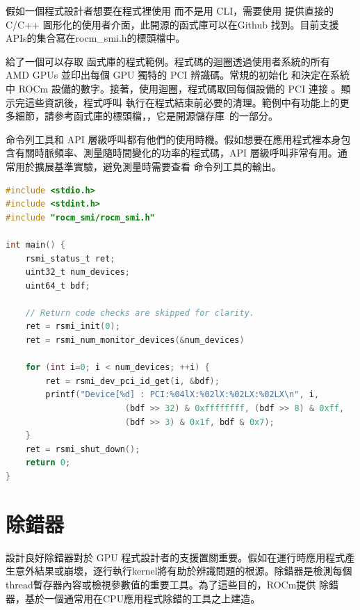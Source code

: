 假如一個程式設計者想要在程式裡使用  而不是用 CLI，需要使用  提供直接的 C/C++ 圖形化的使用者介面，此開源的函式庫可以在Github \cite{ROCm-SMI-Lib} 找到。目前支援APIs的集合寫在rocm\_smi.h的標頭檔中。

 給了一個可以存取  函式庫的程式範例。程式碼的迴圈透過使用者系統的所有 AMD GPUs 並印出每個 GPU 獨特的 PCI  辨識碼。常規的初始化  和決定在系統中 ROCm 設備的數字。接著，使用迴圈，程式碼取回每個設備的 PCI 連接 。顯示完這些資訊後，程式呼叫  執行在程式結束前必要的清理。範例中有功能上的更多細節，請參考函式庫的標頭檔，，它是開源儲存庫~\cite{ROCm-SMI-Lib}的一部分。

命令列工具和 API 層級呼叫都有他們的使用時機。假如想要在應用程式裡本身包含有關時脈頻率、測量隨時間變化的功率的程式碼，API 層級呼叫非常有用。通常用於擴展基準實驗，避免測量時需要查看  命令列工具的輸出。

\begin{lstlisting}[language=C, caption={\term{ROCm-SMI-Lib}範例}, label={lst:ROCm-SMI-Lib}]
#include <stdio.h>
#include <stdint.h>
#include "rocm_smi/rocm_smi.h"

int main() {
    rsmi_status_t ret;
    uint32_t num_devices;
    uint64_t bdf;

    // Return code checks are skipped for clarity.
    ret = rsmi_init(0);
    ret = rsmi_num_monitor_devices(&num_devices)

    for (int i=0; i < num_devices; ++i) {
        ret = rsmi_dev_pci_id_get(i, &bdf);
        printf("Device[%d] : PCI:%04lX:%02lX:%02LX:%02LX\n", i,
                        (bdf >> 32) & 0xffffffff, (bdf >> 8) & 0xff,
                        (bdf >> 3) & 0x1f, bdf & 0x7);
    }
    ret = rsmi_shut_down();
    return 0;
}
\end{lstlisting}

\section{ 除錯器}
\label{sec:7.3}

設計良好除錯器對於 GPU 程式設計者的支援置關重要。假如在運行時應用程式產生意外結果或崩壞，逐行執行kernel將有助於辨識問題的根源。除錯器是檢測每個thread暫存器內容或檢視參數值的重要工具。為了這些目的，ROCm提供  除錯器，基於一個通常用在CPU應用程式除錯的工具之上建造。

